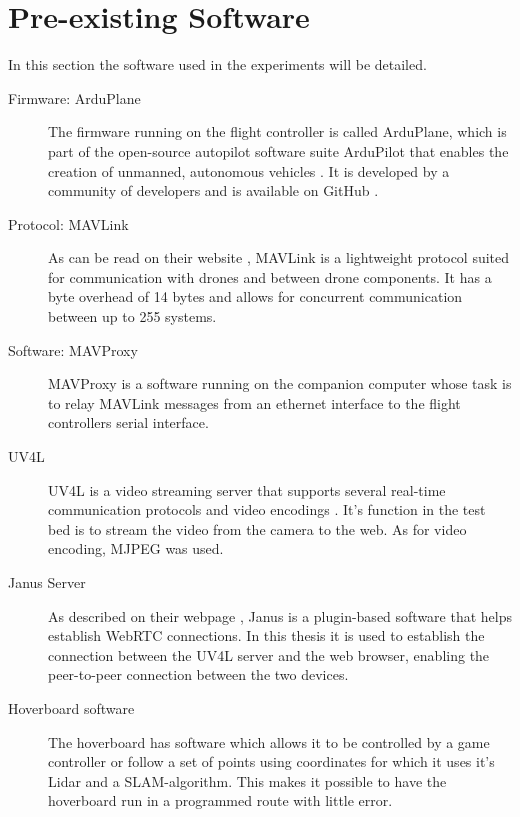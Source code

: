 \documentclass[nofilelist]{cslthse-msc}
\begin{document}
\section{Pre-existing Software}
In this section the software used in the experiments will be detailed.
\begin{description}
   \item[Firmware: ArduPlane]
   The firmware running on the flight controller is called ArduPlane, which is part of the open-source autopilot software suite ArduPilot that enables the creation of unmanned, autonomous vehicles \cite{ardupilot-org}. It is developed by a community of developers and is available on GitHub \cite{ardupilot-github}.
   
   \item[Protocol: MAVLink]
   As can be read on their website \cite{mavlink}, MAVLink is a lightweight protocol suited for communication with drones and between drone components. It has a byte overhead of 14 bytes and allows for concurrent communication between up to 255 systems. 

   \item [Software: MAVProxy]
   MAVProxy \cite{mavproxy} is a software running on the companion computer whose task is to relay MAVLink messages from an ethernet interface to the flight controllers serial interface. 

   \item[UV4L]
   UV4L is a video streaming server that supports several real-time communication protocols and video encodings \cite{uv4l}. It's function in the test bed is to stream the video from the camera to the web. As for video encoding, MJPEG was used.
   
   \item[Janus Server]
   As described on their webpage \cite{janus}, Janus is a plugin-based software that helps establish WebRTC connections. In this thesis it is used to establish the connection between the UV4L server and the web browser, enabling the peer-to-peer connection between the two devices.

   \item[Hoverboard software] The hoverboard has software which allows it to be controlled by a game controller or follow a set of points using coordinates for which it uses it's Lidar and a SLAM-algorithm. This makes it possible to have the hoverboard run in a programmed route with little error. 
\end{description}
\end{document}
